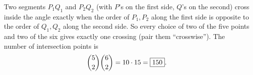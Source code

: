 Two segments $P_1Q_1$ and $P_2Q_2$ (with $P$'s on the first side, $Q$'s on the second) cross inside the angle exactly when the order of $P_1,P_2$ along the first side is opposite to the order of $Q_1,Q_2$ along the second side. So every choice of two of the five points and two of the six gives exactly one crossing (pair them ``crosswise''). The number of intersection points is
\[\dbinom52\dbinom62=10\cdot15=\boxed{150}.\]
